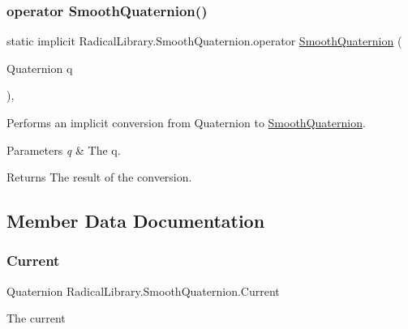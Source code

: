 \subsubsection{\texorpdfstring{operator Smooth\+Quaternion()}{operator SmoothQuaternion()}}
{\footnotesize\ttfamily static implicit Radical\+Library.\+Smooth\+Quaternion.\+operator \hyperlink{class_radical_library_1_1_smooth_quaternion}{Smooth\+Quaternion} (\begin{DoxyParamCaption}\item[{Quaternion}]{q }\end{DoxyParamCaption})\hspace{0.3cm}{\ttfamily [inline]}, {\ttfamily [static]}}



Performs an implicit conversion from Quaternion to \hyperlink{class_radical_library_1_1_smooth_quaternion}{Smooth\+Quaternion}. 


\begin{DoxyParams}{Parameters}
{\em q} & The q.\\
\hline
\end{DoxyParams}
\begin{DoxyReturn}{Returns}
The result of the conversion.
\end{DoxyReturn}


\subsection{Member Data Documentation}
\mbox{\label{class_radical_library_1_1_smooth_quaternion_ad699403357ee442582c0e60ac9ba4a18}} 
\subsubsection{\texorpdfstring{Current}{Current}}
{\footnotesize\ttfamily Quaternion Radical\+Library.\+Smooth\+Quaternion.\+Current}



The current 

\mbox{\label{class_radical_library_1_1_smooth_quaternion_ad259915700a8735a90461729e85f27c4}} 
